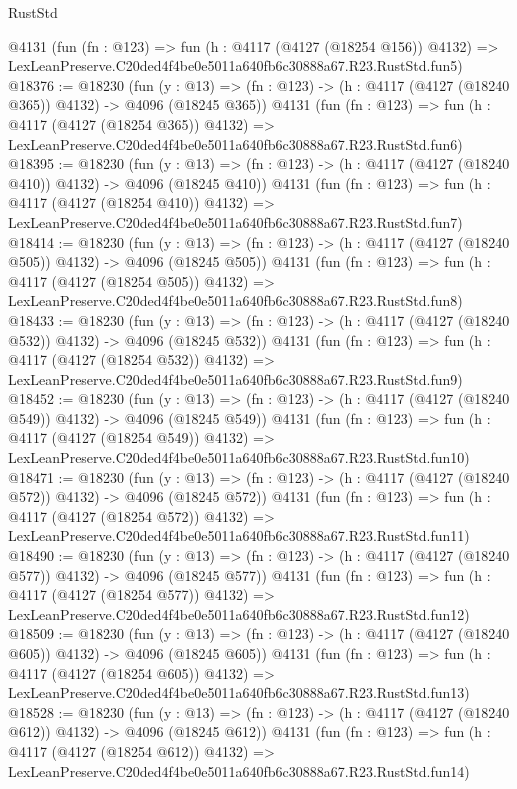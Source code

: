 \begin{lexlean}{RustStd}
\begin{coremodule}
    @4131
    (fun (fn : @123) =>
    fun (h : @4117 (@4127 (@18254 @156)) @4132) =>
    LexLeanPreserve.C20ded4f4be0e5011a640fb6c30888a67.R23.RustStd.fun5)
@18376 := @18230
    (fun (y : @13) => (fn : @123) -> (h : @4117 (@4127 (@18240 @365)) @4132) -> @4096 (@18245 @365))
    @4131
    (fun (fn : @123) =>
    fun (h : @4117 (@4127 (@18254 @365)) @4132) =>
    LexLeanPreserve.C20ded4f4be0e5011a640fb6c30888a67.R23.RustStd.fun6)
@18395 := @18230
    (fun (y : @13) => (fn : @123) -> (h : @4117 (@4127 (@18240 @410)) @4132) -> @4096 (@18245 @410))
    @4131
    (fun (fn : @123) =>
    fun (h : @4117 (@4127 (@18254 @410)) @4132) =>
    LexLeanPreserve.C20ded4f4be0e5011a640fb6c30888a67.R23.RustStd.fun7)
@18414 := @18230
    (fun (y : @13) => (fn : @123) -> (h : @4117 (@4127 (@18240 @505)) @4132) -> @4096 (@18245 @505))
    @4131
    (fun (fn : @123) =>
    fun (h : @4117 (@4127 (@18254 @505)) @4132) =>
    LexLeanPreserve.C20ded4f4be0e5011a640fb6c30888a67.R23.RustStd.fun8)
@18433 := @18230
    (fun (y : @13) => (fn : @123) -> (h : @4117 (@4127 (@18240 @532)) @4132) -> @4096 (@18245 @532))
    @4131
    (fun (fn : @123) =>
    fun (h : @4117 (@4127 (@18254 @532)) @4132) =>
    LexLeanPreserve.C20ded4f4be0e5011a640fb6c30888a67.R23.RustStd.fun9)
@18452 := @18230
    (fun (y : @13) => (fn : @123) -> (h : @4117 (@4127 (@18240 @549)) @4132) -> @4096 (@18245 @549))
    @4131
    (fun (fn : @123) =>
    fun (h : @4117 (@4127 (@18254 @549)) @4132) =>
    LexLeanPreserve.C20ded4f4be0e5011a640fb6c30888a67.R23.RustStd.fun10)
@18471 := @18230
    (fun (y : @13) => (fn : @123) -> (h : @4117 (@4127 (@18240 @572)) @4132) -> @4096 (@18245 @572))
    @4131
    (fun (fn : @123) =>
    fun (h : @4117 (@4127 (@18254 @572)) @4132) =>
    LexLeanPreserve.C20ded4f4be0e5011a640fb6c30888a67.R23.RustStd.fun11)
@18490 := @18230
    (fun (y : @13) => (fn : @123) -> (h : @4117 (@4127 (@18240 @577)) @4132) -> @4096 (@18245 @577))
    @4131
    (fun (fn : @123) =>
    fun (h : @4117 (@4127 (@18254 @577)) @4132) =>
    LexLeanPreserve.C20ded4f4be0e5011a640fb6c30888a67.R23.RustStd.fun12)
@18509 := @18230
    (fun (y : @13) => (fn : @123) -> (h : @4117 (@4127 (@18240 @605)) @4132) -> @4096 (@18245 @605))
    @4131
    (fun (fn : @123) =>
    fun (h : @4117 (@4127 (@18254 @605)) @4132) =>
    LexLeanPreserve.C20ded4f4be0e5011a640fb6c30888a67.R23.RustStd.fun13)
@18528 := @18230
    (fun (y : @13) => (fn : @123) -> (h : @4117 (@4127 (@18240 @612)) @4132) -> @4096 (@18245 @612))
    @4131
    (fun (fn : @123) =>
    fun (h : @4117 (@4127 (@18254 @612)) @4132) =>
    LexLeanPreserve.C20ded4f4be0e5011a640fb6c30888a67.R23.RustStd.fun14)

\end{coremodule}
\end{lexlean}
